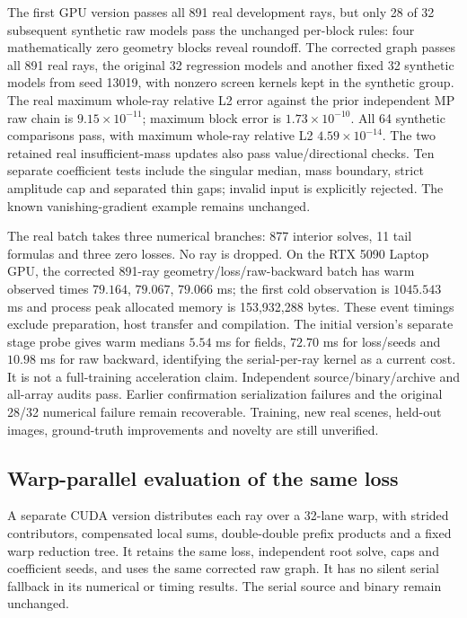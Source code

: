 \documentclass[11pt,a4paper]{article}
\begin{document}
The first GPU version passes all 891 real development rays, but only
28 of 32 subsequent synthetic raw models pass the unchanged per-block
rules: four mathematically zero geometry blocks reveal roundoff.
The corrected graph passes all 891 real rays, the original 32 regression
models and another fixed 32 synthetic models from seed 13019, with
nonzero screen kernels kept in the synthetic group. The real maximum
whole-ray relative L2 error against the prior independent MP raw chain
is $9.15\times10^{-11}$; maximum block error is
$1.73\times10^{-10}$. All 64 synthetic comparisons pass, with maximum
whole-ray relative L2 $4.59\times10^{-14}$. The two retained real
insufficient-mass updates also pass value/directional checks. Ten
separate coefficient tests include the singular median, mass boundary,
strict amplitude cap and separated thin gaps; invalid input is explicitly
rejected. The known vanishing-gradient example remains unchanged.

The real batch takes three numerical branches: 877 interior solves,
11 tail formulas and three zero losses. No ray is dropped. On the
RTX 5090 Laptop GPU, the corrected 891-ray geometry/loss/raw-backward
batch has warm observed times $79.164$, $79.067$, $79.066$ ms;
the first cold observation is $1045.543$ ms and process peak allocated
memory is 153,932,288 bytes. These event timings exclude preparation,
host transfer and compilation. The initial version's separate stage
probe gives warm medians $5.54$ ms for fields, $72.70$ ms for loss/seeds
and $10.98$ ms for raw backward, identifying the serial-per-ray kernel
as a current cost. It is not a full-training acceleration claim.
Independent source/binary/archive and all-array audits pass. Earlier
confirmation serialization failures and the original 28/32 numerical
failure remain recoverable. Training, new real scenes, held-out images,
ground-truth improvements and novelty are still unverified.

\subsection{Warp-parallel evaluation of the same loss}
A separate CUDA version distributes each ray over a 32-lane warp, with
strided contributors, compensated local sums, double-double prefix
products and a fixed warp reduction tree. It retains the same loss,
independent root solve, caps and coefficient seeds, and uses the same
corrected raw graph. It has no silent serial fallback in its numerical
or timing results. The serial source and binary remain unchanged.
\end{document}
